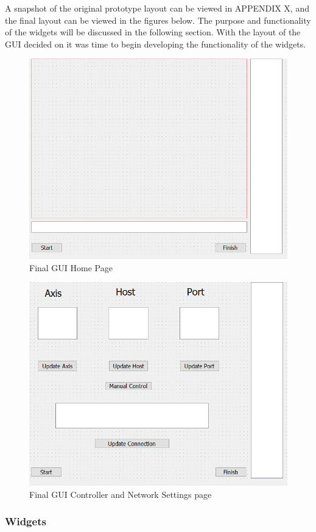 A snapshot of the original prototype layout can be viewed in APPENDIX X, and the final layout can be viewed in the figures below. The purpose and functionality of the widgets will be discussed in the following section. With the layout of the GUI decided on it was time to begin developing the functionality of the widgets.
\begin{figure}[ht]
	\includegraphics[width=\linewidth]{Final_GUI_HOME.png}
	\caption{Final GUI Home Page}
	\label{fig:GUIHome}
\end{figure}
\begin{figure}[ht]
	\includegraphics[width=\linewidth]{Final_GUI_CTRL.png}
	\caption{Final GUI Controller and Network Settings page}
	\label{fig:GUICtrl}
\end{figure}

\subsubsection{Widgets}






